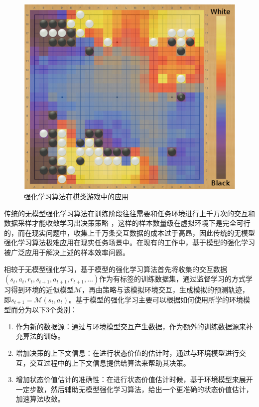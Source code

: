 \begin{figure}
  \centering
  \includegraphics[width=\linewidth]{figures/rl-go.png}
  \caption{强化学习算法在棋类游戏中的应用}
  \label{fig:rl-go}
\end{figure}


传统的无模型强化学习算法在训练阶段往往需要和任务环境进行上千万次的交互和数据采样才能收敛学习出决策策略 \cite{degris2012model}，这样的样本数量级在虚拟环境下是完全可行的，而在现实问题中，收集上千万条交互数据的成本过于高昂，因此传统的无模型强化学习算法极难应用在现实任务场景中。在现有的工作中，基于模型的强化学习被广泛应用于解决上述的样本效率问题\cite{osband2014model,moerland2020model}。

相较于无模型强化学习，基于模型的强化学习算法首先将收集的交互数据$(s_t,a_t,r_t,s_{t+1},a_{t+1},r_{t+1},\ldots)$作为有标签的训练数据集，通过监督学习的方式学习得到环境的近似模型$\mathcal{M}$，再由策略与该模拟环境交互，生成模拟的预测轨迹，即$s_{t+1}=\mathcal{M}(s_t,a_t)$。基于模型的强化学习主要可以根据如何使用所学的环境模型而分为以下3个类别\cite{pal2020brief}：

\begin{enumerate}[1)]
    \item 作为新的数据源：通过与环境模型交互产生数据，作为额外的训练数据源来补充算法的训练。
    \item 增加决策的上下文信息：在进行状态价值的估计时，通过与环境模型进行交互，交互过程中的上下文信息提供给算法来帮助其决策。
    \item 增加状态价值估计的准确性：在进行状态价值估计时候，基于环境模型来展开一定步数，然后辅助无模型强化学习算法，给出一个更准确的状态价值估计，加速算法收敛。
\end{enumerate}

